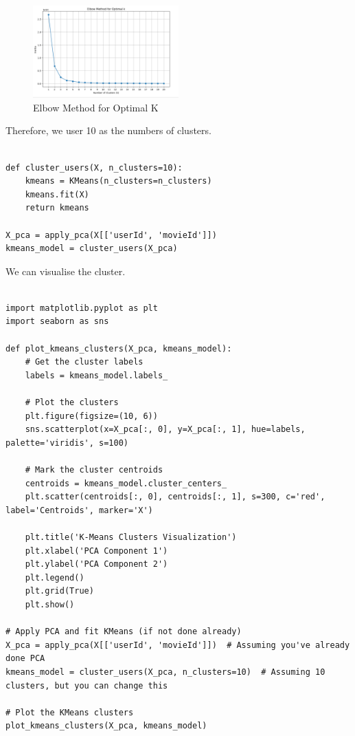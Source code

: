 \documentclass[conference]{IEEEtran}
\begin{document}
\begin{figure}[h] %
    \centering %
    \includegraphics[width=0.5\textwidth]{Elbow.png} %
    \caption{Elbow Method for Optimal K}
    \label{fig: Elbow Method for Optimal K}
\end{figure}

Therefore, we user 10 as the numbers of clusters.

\begin{lstlisting}

def cluster_users(X, n_clusters=10):
    kmeans = KMeans(n_clusters=n_clusters)
    kmeans.fit(X)
    return kmeans

X_pca = apply_pca(X[['userId', 'movieId']])
kmeans_model = cluster_users(X_pca)
\end{lstlisting}

We can visualise the cluster.

\begin{lstlisting}

import matplotlib.pyplot as plt
import seaborn as sns

def plot_kmeans_clusters(X_pca, kmeans_model):
    # Get the cluster labels
    labels = kmeans_model.labels_

    # Plot the clusters
    plt.figure(figsize=(10, 6))
    sns.scatterplot(x=X_pca[:, 0], y=X_pca[:, 1], hue=labels, palette='viridis', s=100)
    
    # Mark the cluster centroids
    centroids = kmeans_model.cluster_centers_
    plt.scatter(centroids[:, 0], centroids[:, 1], s=300, c='red', label='Centroids', marker='X')

    plt.title('K-Means Clusters Visualization')
    plt.xlabel('PCA Component 1')
    plt.ylabel('PCA Component 2')
    plt.legend()
    plt.grid(True)
    plt.show()

# Apply PCA and fit KMeans (if not done already)
X_pca = apply_pca(X[['userId', 'movieId']])  # Assuming you've already done PCA
kmeans_model = cluster_users(X_pca, n_clusters=10)  # Assuming 10 clusters, but you can change this

# Plot the KMeans clusters
plot_kmeans_clusters(X_pca, kmeans_model)
\end{lstlisting}
\end{document}
